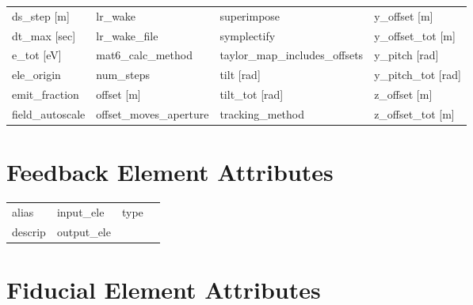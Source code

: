 \begin{tabular}{llll}
ds_step [m]                      & lr_wake                          & superimpose                      & y_offset [m]                     \\
dt_max [sec]                     & lr_wake_file                     & symplectify                      & y_offset_tot [m]                 \\
e_tot [eV]                       & mat6_calc_method                 & taylor_map_includes_offsets      & y_pitch [rad]                    \\
ele_origin                       & num_steps                        & tilt [rad]                       & y_pitch_tot [rad]                \\
emit_fraction                    & offset [m]                       & tilt_tot [rad]                   & z_offset [m]                     \\
field_autoscale                  & offset_moves_aperture            & tracking_method                  & z_offset_tot [m]                 \\
 \bottomrule
 \end{tabular}
 \vfill
 
 \section{Feedback Element Attributes}
 \label{s:list.feedback}
 
 \begin{tabular}{llll} \toprule
alias                            & input_ele                        & type                             &                                  \\
descrip                          & output_ele                       &                                  &                                  \\
 \bottomrule
 \end{tabular}
 \vfill
 
 \section{Fiducial Element Attributes}
 \label{s:list.fiducial}
 
